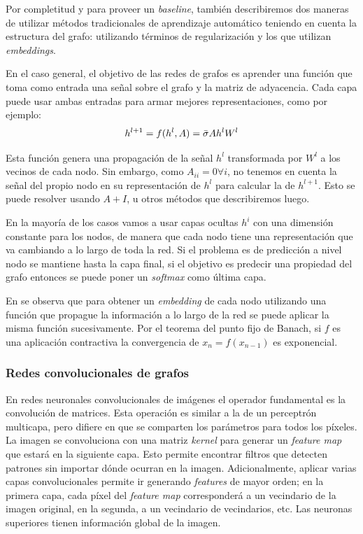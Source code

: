 \documentclass[
    left=2.0cm,         %
    right=2.0cm,        %
    top=2.0cm,          %
    bottom=2.5cm,         %
    bindingoffset=6mm,  %
    nohyphenation=false %
]{eiti/eiti-thesis}
\begin{document}
Por completitud y para proveer un \textit{baseline}, también describiremos dos maneras
de utilizar métodos tradicionales de aprendizaje automático teniendo en cuenta la estructura
del grafo: utilizando términos de regularización y los que utilizan \textit{embeddings}.

En el caso general, el objetivo de las redes de grafos es aprender una función que toma
como entrada una señal sobre el grafo y la matriz de adyacencia\cite{kipf2016gcn}. 
Cada capa puede usar ambas entradas para armar mejores representaciones, 
como por ejemplo:
\begin{equation*}
    \Large
    h^{l+1} = f(h^l, A) = \bar\sigma A h^l W^l
\end{equation*}

Esta función genera una propagación de la señal $h^l$ transformada por $W^l$ a
los vecinos de cada nodo. Sin embargo, como $A_{ii} = 0 \forall i$, no tenemos
en cuenta la señal del propio nodo en su representación de $h^l$ para calcular
la de $h^{l+1}$. Esto se puede resolver usando $A+I$, u otros métodos que describiremos
luego.

En la mayoría de los casos vamos a usar capas ocultas $h^i$ con una dimensión constante
para los nodos, de manera que cada nodo tiene una representación que va cambiando a lo
largo de toda la red. Si el problema es de predicción a nivel nodo se mantiene hasta la
capa final, si el objetivo es predecir una propiedad del grafo entonces se puede poner un
\textit{softmax} como última capa. 

En \cite{zhou2018graphreview} se observa que para obtener un \textit{embedding} de cada
nodo utilizando una función que propague la información a lo largo de la red se puede
aplicar la misma función sucesivamente. Por el teorema del punto fijo de Banach, si
$f$ es una aplicación contractiva la convergencia de $x_n = f(x_{n-1})$ es exponencial.


\subsubsection{Redes convolucionales de grafos}

En redes neuronales convolucionales de imágenes el operador fundamental es la convolución de
matrices. Esta operación es similar a la de un perceptrón multicapa, pero difiere en que 
se comparten los parámetros para todos los píxeles. La imagen se convoluciona con una
matriz \textit{kernel} para generar un \textit{feature map} que estará en la siguiente capa.
Esto permite encontrar filtros que detecten patrones sin importar dónde ocurran en la imagen.
Adicionalmente, aplicar varias capas convolucionales permite ir generando \textit{features}
de mayor orden; en la primera capa, cada píxel del \textit{feature map} corresponderá a un
vecindario de la imagen original, en la segunda, a un vecindario de vecindarios, etc. \cite{lecun1998gradient}
Las neuronas superiores tienen información global de la imagen.
\end{document}
